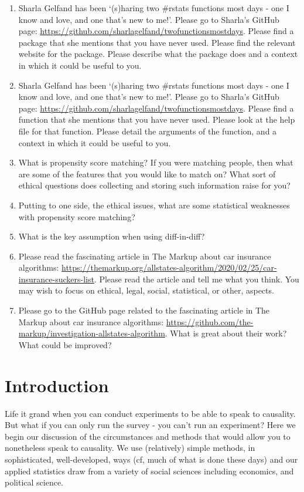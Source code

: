\documentclass[
]{book}
\providecommand{\tightlist}{%
  \setlength{\itemsep}{0pt}\setlength{\parskip}{0pt}}
\begin{document}
\begin{enumerate}
\def\labelenumi{\arabic{enumi}.}
\tightlist
\item
  Sharla Gelfand has been `(s)haring two \#rstats functions most days - one I know and love, and one that's new to me!'. Please go to Sharla's GitHub page: \url{https://github.com/sharlagelfand/twofunctionsmostdays}. Please find a package that she mentions that you have never used. Please find the relevant website for the package. Please describe what the package does and a context in which it could be useful to you.
\item
  Sharla Gelfand has been `(s)haring two \#rstats functions most days - one I know and love, and one that's new to me!'. Please go to Sharla's GitHub page: \url{https://github.com/sharlagelfand/twofunctionsmostdays}. Please find a function that she mentions that you have never used. Please look at the help file for that function. Please detail the arguments of the function, and a context in which it could be useful to you.
\item
  What is propensity score matching? If you were matching people, then what are some of the features that you would like to match on? What sort of ethical questions does collecting and storing such information raise for you?
\item
  Putting to one side, the ethical issues, what are some statistical weaknesses with propensity score matching?
\item
  What is the key assumption when using diff-in-diff?
\item
  Please read the fascinating article in The Markup about car insurance algorithms: \url{https://themarkup.org/allstates-algorithm/2020/02/25/car-insurance-suckers-list}. Please read the article and tell me what you think. You may wish to focus on ethical, legal, social, statistical, or other, aspects.
\item
  Please go to the GitHub page related to the fascinating article in The Markup about car insurance algorithms: \url{https://github.com/the-markup/investigation-allstates-algorithm}. What is great about their work? What could be improved?
\end{enumerate}

\hypertarget{introduction-19}{%
\section{Introduction}\label{introduction-19}}

Life it grand when you can conduct experiments to be able to speak to causality. But what if you can only run the survey - you can't run an experiment? Here we begin our discussion of the circumstances and methods that would allow you to nonetheless speak to causality. We use (relatively) simple methods, in sophisticated, well-developed, ways (cf, much of what is done these days) and our applied statistics draw from a variety of social sciences including economics, and political science.
\end{document}
